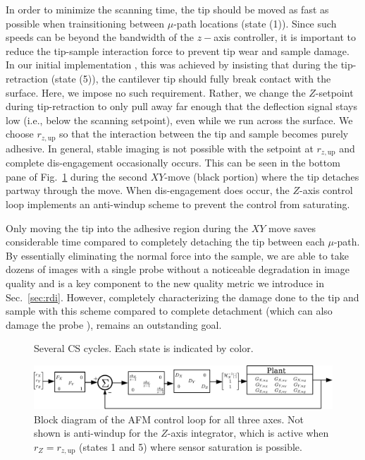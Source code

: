\documentclass[journal]{IEEEtran}
\newcommand{\rzup}{\ensuremath{r_{z,\textrm{up}}}\xspace}
\begin{document}
In order to minimize the scanning time, the tip should be moved as fast as possible when trainsitioning between $\mu$-path locations (state (1)). Since such speeds can be beyond the bandwidth of the $z-$axis controller, it is important to reduce the tip-sample interaction force to prevent tip wear and sample damage. In our initial implementation \cite{braker_hardware_2018}, 
this was achieved by insisting that during the
tip-retraction (state (5)), the cantilever tip should fully break
contact with the surface. Here, we impose no such requirement. Rather,
we change the $Z$-setpoint during tip-retraction to only pull away far
enough that the deflection signal stays low (i.e., below the scanning
setpoint), even while we run across the surface. We choose \rzup so
that the interaction between the tip and sample becomes purely
adhesive. In general, stable imaging is not possible with the setpoint at \rzup and
complete dis-engagement occasionally occurs. This can be seen in the bottom pane of
Fig.~\ref{fig:cs_cycle} during the second $XY$-move (black portion) where the tip detaches partway through the move.
When dis-engagement does occur, the $Z$-axis control loop implements an anti-windup scheme to prevent the control from saturating.


Only moving the tip into the adhesive region during the $XY$ move saves considerable time
compared to completely detaching the tip between each $\mu$-path. By essentially eliminating the normal force into the sample, we are able to take dozens of images with a single probe without a noticeable degradation in image quality and is a key component to the new quality metric we introduce in Sec.~\ref{sec:rdi}. However, completely characterizing the damage done to the tip and sample with this scheme compared to complete detachment (which can also damage the probe \cite{meyer_atomic_1992}), remains an outstanding goal.

\begin{figure}[t!]
  \centering 
  \caption{Several CS cycles. Each state is indicated by color.}
  \label{fig:cs_cycle}
\end{figure}

\begin{figure}[ht!]
  \centering
  \includegraphics[width=1\textwidth]{figures/AFM_loop_xyz.pdf}
  \caption{Block diagram of the AFM control loop for all three axes.
    Not shown is anti-windup for the $Z$-axis integrator, which is active
    when $r_Z=\rzup$ (states 1 and 5) where sensor saturation is possible.}
  \label{fig:afm_bd_dinv}
\end{figure}
\end{document}

